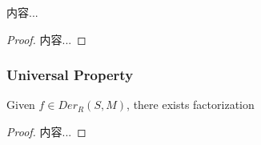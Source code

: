 \documentclass[Total.tex]{subfiles}
\begin{document}
		\begin{corollary}
			内容...
		\end{corollary}
		\begin{proof}
			内容...
		\end{proof}
		\subsubsection{Universal Property}
		\begin{proposition}
			Given $f\in Der_R(S,M)$, there exists factorization
			\begin{center}
			\end{center}
		\end{proposition}
		\begin{proof}
			内容...
		\end{proof}
\end{document}
